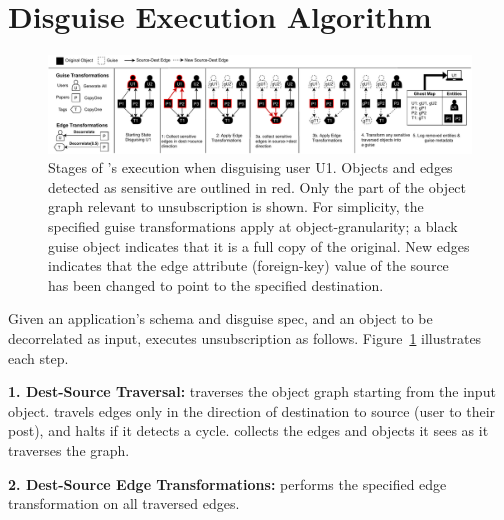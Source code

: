 \section{Disguise Execution Algorithm}

\begin{figure}[ht!]
    \centering
    \includegraphics[width=\textwidth]{img/algo}

    \caption{Stages of \sys's execution when disguising user U1. Objects and edges detected as
    sensitive are outlined in red. Only the part of the object graph relevant to unsubscription is
    shown.  For simplicity, the specified guise transformations apply at object-granularity; a black
    guise object indicates that it is a full copy of the original.  New edges indicates that the
    edge attribute (foreign-key) value of the source has been changed to point to the specified destination.\\
    }
    \label{fig:algo}
\end{figure}

Given an application's schema and disguise spec, and an object to be decorrelated as input,
\sys executes unsubscription as follows. Figure~\ref{fig:algo} illustrates each step.
    
    \vspace{0.5\baselineskip}\noindent\textbf{1. Dest-Source Traversal:} 
        \sys traverses the object graph starting from the input object. \sys travels edges only in
        the direction of destination to source (\eg user to their post), and halts if it detects a
        cycle.
        \sys collects the edges and objects it sees as it traverses the graph.

    \vspace{0.5\baselineskip}\noindent\textbf{2. Dest-Source Edge Transformations:}
        \sys performs the specified edge transformation on all traversed edges.
     
